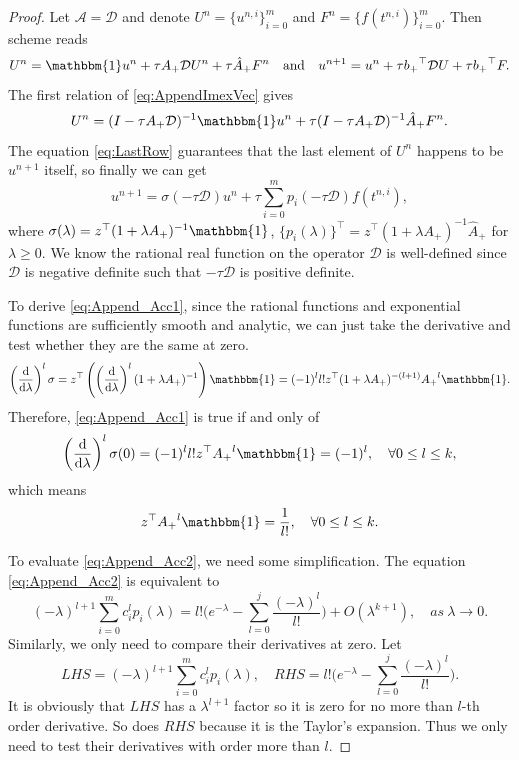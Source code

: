 \documentclass[a4paper, oneside]{book}
\def\calA{{\mathcal{A}}}
\def\rmd{{\mathrm{d}}}
\def\bbone{{\mathbbm{1}}}
\def\hatA{{\hat{A}}}
\def\calA{{\mathcal{A}}}
\def\calD{{\mathcal{D}}}
\def\As{{A_+}}
\def\Ahs{{\hatA_+}}
\def\bs{{b_+}}
\begin{document}
\begin{proof}
Let $\calA = \calD$ and denote $U^n = \{u^{n,i}\}_{i=0}^m$ and
$F^n =  \{f(t^{n,i})\}_{i=0}^m$.
Then scheme reads
\begin{equation} \label{eq:AppendImexVec}
        U^n = \bbone u^{n} + \tau \As \calD U^n + \tau \Ahs F^n\quad \text{and}\quad 
        u^{n+1} = u^{n} + \tau \bs^\top \calD  U + \tau \bs^\top F.
\end{equation}
The first relation of \eqref{eq:AppendImexVec} gives 
$$U^n = (I-\tau \As \calD )^{-1}\bbone u^{n} + \tau (I-\tau \As \calD )^{-1}\Ahs F^n.$$
The equation \eqref{eq:LastRow} guarantees that 
the last element of $U^n$ happens to be $u^{n+1}$ itself, 
so finally we can get
$$u^{n+1} = \sigma(-\tau \calD )u^{n} + \tau \sum_{i=0}^mp_i(-\tau \calD )f(t^{n,i}), $$
where $\sigma(\lambda) = z^\top (1+\lambda \As)^{-1}\bbone$, 
$\{p_i(\lambda)\}^\top = z^\top (1+\lambda \As)^{-1} \Ahs $
for $\lambda \geq 0$. 
We know the rational real function on the operator $\calD $ is 
well-defined since $\calD$ is negative definite such that $-\tau \calD$ is positive definite. 





To derive \eqref{eq:Append_Acc1}, since the rational functions and 
exponential functions are sufficiently smooth and analytic, we can just take the derivative and
test whether they are the same at zero. 
$$\left(\frac{\rmd}{\rmd \lambda}\right)^l\sigma = z^\top \left(\left(\frac{\rmd}{\rmd \lambda}\right)^l (1+\lambda \As)^{-1}\right)\bbone
=(-1)^l l! z^\top (1+\lambda \As)^{-(l+1)}\As^l\bbone. $$
Therefore, \eqref{eq:Append_Acc1} is true if and only of
$$\left(\frac{\rmd}{\rmd \lambda}\right)^l\sigma(0) = (-1)^l l! z^\top \As^l \bbone = (-1)^l, \quad \forall 0\leq l \leq k,$$
which means 
$$  z^\top \As^l \bbone = \frac{1}{l!}, \quad \forall 0\leq l \leq k.$$

To evaluate \eqref{eq:Append_Acc2}, 
we need some simplification.
The equation \eqref{eq:Append_Acc2} is equivalent to 
\begin{equation}\label{eq:Append_Acc2b}
    (-\lambda)^{l+1}\sum_{i=0}^m c_i^lp_i(\lambda) = l!
    \Big(e^{-\lambda} -\sum_{l=0}^j \frac{(-\lambda)^l}{l!}\Big)
    + O(\lambda^{k+1}), \quad as~\lambda \to 0. 
\end{equation}
Similarly, we only need to compare their derivatives at zero. 
Let $$LHS =  (-\lambda)^{l+1}\sum_{i=0}^m c_i^lp_i(\lambda),\quad RHS = l!
\Big(e^{-\lambda} -\sum_{l=0}^j \frac{(-\lambda)^l}{l!}\Big).$$
It is obviously that $LHS$ has a $\lambda^{l+1}$ factor 
so it is zero for no more than $l$-th order derivative. 
So does $RHS$ because it is 
the Taylor's expansion. 
Thus we only need to test their derivatives with order 
more than $l$.


\end{proof}
\end{document}

